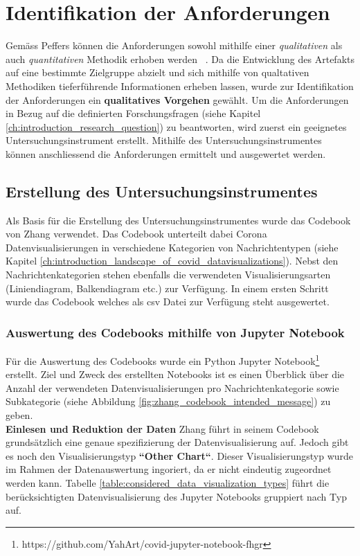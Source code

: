 \section{Identifikation der Anforderungen}
Gemäss Peffers können die Anforderungen sowohl mithilfe einer \textit{qualitativen} als auch \textit{quantitativen} Methodik erhoben werden ~\citep[S. 55]{peffers}. Da die Entwicklung des Artefakts auf eine bestimmte Zielgruppe abzielt und sich mithilfe von qualtativen Methodiken tieferführende Informationen erheben lassen, wurde zur Identifikation der Anforderungen ein \textbf{qualitatives Vorgehen} gewählt. Um die Anforderungen in Bezug auf die definierten Forschungsfragen (siehe Kapitel \ref{ch:introduction_research_question}) zu beantworten, wird zuerst ein geeignetes Untersuchungsinstrument erstellt. Mithilfe des Untersuchungsinstrumentes können anschliessend die Anforderungen ermittelt und ausgewertet werden.

\subsection{Erstellung des Untersuchungsinstrumentes}
Als Basis für die Erstellung des Untersuchungsinstrumentes wurde das Codebook von Zhang verwendet. Das Codebook unterteilt dabei Corona Datenvisualisierungen in verschiedene Kategorien von Nachrichtentypen (siehe Kapitel \ref{ch:introduction_landscape_of_covid_datavisualizations}). Nebst den Nachrichtenkategorien stehen ebenfalls die verwendeten Visualisierungsarten (Liniendiagram, Balkendiagram etc.) zur Verfügung. In einem ersten Schritt wurde das Codebook welches als \gls{csv} Datei zur Verfügung steht ausgewertet.

\subsubsection{Auswertung des Codebooks mithilfe von Jupyter Notebook} \label{ch:analysis_of_codebook}
Für die Auswertung des Codebooks wurde ein Python Jupyter Notebook\footnote{https://github.com/YahArt/covid-jupyter-notebook-fhgr} erstellt. Ziel und Zweck des erstellten Notebooks ist es einen Überblick über die Anzahl der verwendeten Datenvisualisierungen pro Nachrichtenkategorie sowie Subkategorie (siehe Abbildung \ref{fig:zhang_codebook_intended_message}) zu geben.\\

\clearpage
\noindent
\textbf{Einlesen und Reduktion der Daten}
\newline
\indent
Zhang führt in seinem Codebook grundsätzlich eine genaue spezifizierung der Datenvisualisierung auf. Jedoch gibt es noch den Visualisierungstyp \textbf{``Other Chart``}. Dieser Visualisierungstyp wurde im Rahmen der Datenauswertung ingoriert, da er nicht eindeutig zugeordnet werden kann. Tabelle \ref{table:considered_data_visualization_types} führt die berücksichtigten Datenvisualisierung des Jupyter Notebooks gruppiert nach Typ auf.

